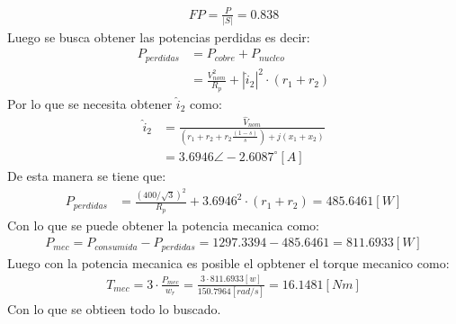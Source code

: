 \documentclass[
  11pt,
  letterpaper,
   addpoints,
   answers
  ]{exam}
\begin{document}
\begin{questions}
\begin{solution}
        \begin{align}
            FP = \frac{P}{|S|} = 0.838
        \end{align}
        Luego se busca obtener las potencias perdidas es decir:
        \begin{align}
            P_{perdidas} &= P_{cobre} + P_{nucleo}\\
            &= \frac{V_{nom}^{2}}{R_{p}} + |\hat{i}_{2}|^{2} \cdot(r_{1} + r_{2}) 
        \end{align}
        Por lo que se necesita obtener $\hat{i}_{2}$ como:
        \begin{align}
            \hat{i}_{2}& = \frac{\hat{V}_{nom}}{\left(r_{1} + r_{2} + r_{2}\frac{(1-s)}{s} \right)+ j(x_{1}+x_{2})}\\
            &= 3.6946 \angle -2.6087^{\circ}[A] 
        \end{align} 
        De esta manera se tiene que:
        \begin{align}
            P_{perdidas} &= \frac{(400/\sqrt{3})^{2}}{R_{p}} + 3.6946^{2} \cdot (r_{1} + r_{2}) = 485.6461[W]
        \end{align}
        Con lo que se puede obtener la potencia mecanica como:
        \begin{align}
            P_{mec} = P_{consumida} - P_{perdidas} = 1297.3394-485.6461 = 811.6933[W]
        \end{align}
        Luego con la potencia mecanica es posible el opbtener el torque mecanico como:
        \begin{align}
            T_{mec} = 3\cdot \frac{P_{mec}}{ w_{r}} = \frac{3 \cdot 811.6933[w] }{150.7964[rad/s]} = 16.1481[Nm]
        \end{align}
        Con lo que se obtieen todo lo buscado.

\end{solution}
\end{questions}
\end{document}

